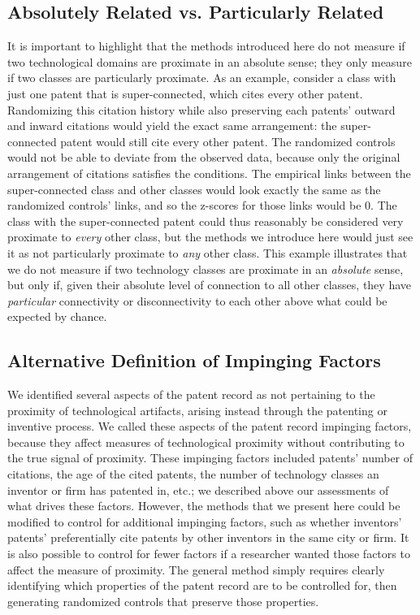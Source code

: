 \documentclass[]{svjour3}
\begin{document}
\subsection{Absolutely Related vs. Particularly Related}
It is important to highlight that the methods introduced here do not measure if two technological domains are proximate in an absolute sense; they only measure if two classes are particularly proximate. As an example, consider a class with just one patent that is super-connected, which cites every other patent. Randomizing this citation history while also preserving each patents' outward and inward citations would yield the exact same arrangement: the super-connected patent would still cite every other patent. The randomized controls would not be able to deviate from the observed data, because only the original arrangement of citations satisfies the conditions. The empirical links between the super-connected class and other classes would look exactly the same as the randomized controls' links, and so the z-scores for those links would be 0. The class with the super-connected patent could thus reasonably be considered very proximate to \textit{every} other class, but the methods we introduce here would just see it as not particularly proximate to \textit{any} other class. This example illustrates that we do not measure if two technology classes are proximate in an \textit{absolute} sense, but only if, given their absolute level of connection to all other classes, they have \textit{particular} connectivity or disconnectivity to each other above what could be expected by chance.

\subsection{Alternative Definition of Impinging Factors}
We identified several aspects of the patent record as not pertaining to the proximity of technological artifacts, arising instead through the patenting or inventive process. We called these aspects of the patent record impinging factors, because they affect measures of technological proximity without contributing to the true signal of proximity. These impinging factors included patents' number of citations, the age of the cited patents, the number of technology classes an inventor or firm has patented in, etc.; we described above our assessments of what drives these factors. However, the methods that we present here could be modified to control for additional impinging factors, such as whether inventors' patents' preferentially cite patents by other inventors in the same city or firm. It is also possible to control for fewer factors if a researcher wanted those factors to affect the measure of proximity. The general method simply requires clearly identifying which properties of the patent record are to be controlled for, then generating randomized controls that preserve those properties.
\end{document}
